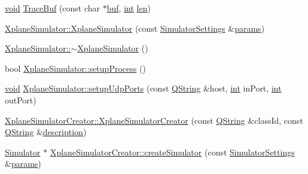 \begin{DoxyCompactItemize}
\item 
\hyperlink{group___u_a_v_objects_plugin_ga444cf2ff3f0ecbe028adce838d373f5c}{void} \hyperlink{group__hitlplugin_ga5b9f24733c0869a10f3ff9ccd27fc6d2}{Trace\-Buf} (const char $\ast$\hyperlink{ioapi_8h_a8ad8a13c88886b9f623034ff88570adb}{buf}, \hyperlink{ioapi_8h_a787fa3cf048117ba7123753c1e74fcd6}{int} \hyperlink{glext_8h_ac759c9f8b2506530e65879e566e59f02}{len})
\item 
\hyperlink{group__hitlplugin_ga5832264c593dd9f80ac14145b83c28c9}{Xplane\-Simulator\-::\-Xplane\-Simulator} (const \hyperlink{group___h_i_t_l_plugin_ga052199f1328d3002bce3e45345aa7f4e}{Simulator\-Settings} \&\hyperlink{glext_8h_afeb6390ab3bc8a0e96a88aff34d52288}{params})
\item 
\hyperlink{group__hitlplugin_ga0254db12886ca7e399e2d27fef9e185a}{Xplane\-Simulator\-::$\sim$\-Xplane\-Simulator} ()
\item 
bool \hyperlink{group__hitlplugin_ga3818193fd63bfaf004e3aab25491f28c}{Xplane\-Simulator\-::setup\-Process} ()
\item 
\hyperlink{group___u_a_v_objects_plugin_ga444cf2ff3f0ecbe028adce838d373f5c}{void} \hyperlink{group__hitlplugin_ga84ae33286060d1b0d834fa2b5f20e2fe}{Xplane\-Simulator\-::setup\-Udp\-Ports} (const \hyperlink{group___u_a_v_objects_plugin_gab9d252f49c333c94a72f97ce3105a32d}{Q\-String} \&host, \hyperlink{ioapi_8h_a787fa3cf048117ba7123753c1e74fcd6}{int} in\-Port, \hyperlink{ioapi_8h_a787fa3cf048117ba7123753c1e74fcd6}{int} out\-Port)
\item 
\hyperlink{group__hitlplugin_gab847bc2dd23d56e8783386fbfacb21ef}{Xplane\-Simulator\-Creator\-::\-Xplane\-Simulator\-Creator} (const \hyperlink{group___u_a_v_objects_plugin_gab9d252f49c333c94a72f97ce3105a32d}{Q\-String} \&class\-Id, const \hyperlink{group___u_a_v_objects_plugin_gab9d252f49c333c94a72f97ce3105a32d}{Q\-String} \&\hyperlink{sdlgamepad_8dox_ae82208d022e4246ddf1e4f481a3f81b0}{description})
\item 
\hyperlink{class_simulator}{Simulator} $\ast$ \hyperlink{group__hitlplugin_gaf7cd7c69acb5effb7d06e7e9236b4a95}{Xplane\-Simulator\-Creator\-::create\-Simulator} (const \hyperlink{group___h_i_t_l_plugin_ga052199f1328d3002bce3e45345aa7f4e}{Simulator\-Settings} \&\hyperlink{glext_8h_afeb6390ab3bc8a0e96a88aff34d52288}{params})
\end{DoxyCompactItemize}
